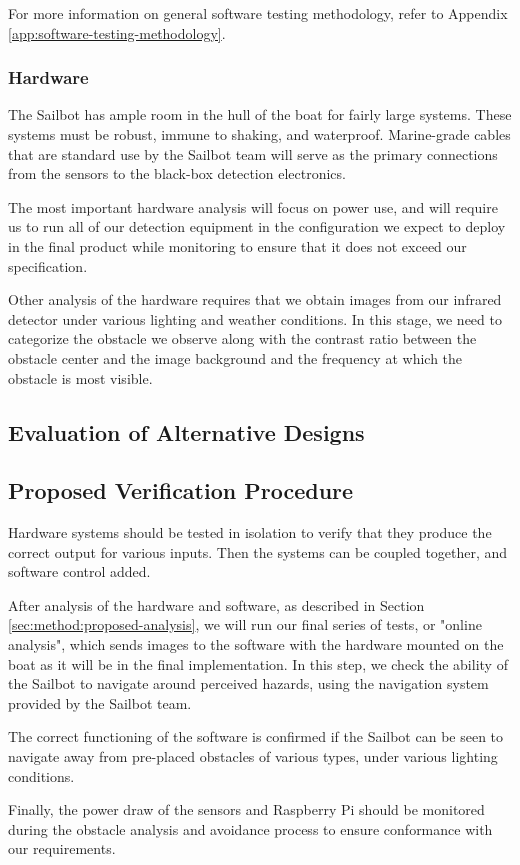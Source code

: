 For more information on general software testing methodology, refer to Appendix \ref{app:software-testing-methodology}.

\subsubsection{\label{sec:method:proposed-analysis:hardware}Hardware}
The Sailbot has ample room in the hull of the boat for fairly large systems. These systems must be robust, immune to shaking, and waterproof. Marine-grade cables that are standard use by the Sailbot team will serve as the primary connections from the sensors to the black-box detection electronics.

The most important hardware analysis will focus on power use, and will require us to run all of our detection equipment in the configuration we expect to deploy in the final product while monitoring to ensure that it does not exceed our specification.

Other analysis of the hardware requires that we obtain images from our infrared detector under various lighting and weather conditions. In this stage, we need to categorize the obstacle we observe along with the contrast ratio between the obstacle center and the image background and the frequency at which the obstacle is most visible.

\subsection{\label{sec:method:evaluation-of-alternative-designs}Evaluation of Alternative Designs}

\subsection{\label{sec:method:proposed-verification-procedure}Proposed Verification Procedure}

Hardware systems should be tested in isolation to verify that they produce the correct output for various inputs. Then the systems can be coupled together, and software control added.

After analysis of the hardware and software, as described in Section \ref{sec:method:proposed-analysis}, we will run our final series of tests, or "online analysis", which sends images to the software with the hardware mounted on the boat as it will be in the final implementation. In this step, we check the ability of the Sailbot to navigate around perceived hazards, using the navigation system provided by the Sailbot team.

The correct functioning of the software is confirmed if the Sailbot can be seen to navigate away from pre-placed obstacles of various types, under various lighting conditions.

Finally, the power draw of the sensors and Raspberry Pi should be monitored during the obstacle analysis and avoidance process to ensure conformance with our requirements.